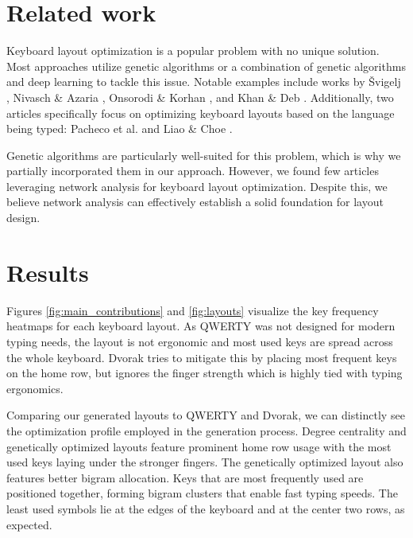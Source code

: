 \documentclass[9pt,twocolumn,twoside]{pnas-report}
\begin{document}
\section*{Related work}

Keyboard layout optimization is a popular problem with no unique solution.
Most approaches utilize genetic algorithms or a combination of genetic algorithms and deep learning to tackle this issue.
Notable examples include works by Švigelj \cite{svigelj2019}, Nivasch \& Azaria \cite{NiAz2021, NiAz2023}, Onsorodi \& Korhan \cite{onsorodi2020}, and Khan \& Deb \cite{KhDe2023}.
Additionally, two articles specifically focus on optimizing keyboard layouts based on the language being typed: Pacheco et al. \cite{eniac} and Liao \& Choe \cite{ChCh2013}.

Genetic algorithms are particularly well-suited for this problem, which is why we partially incorporated them in our approach.
However, we found few articles leveraging network analysis for keyboard layout optimization.
Despite this, we believe network analysis can effectively establish a solid foundation for layout design.

\section*{Results}

Figures \ref{fig:main_contributions} and \ref{fig:layouts} visualize the key frequency heatmaps for each keyboard layout.
As QWERTY was not designed for modern typing needs, the layout is not ergonomic and most used keys are spread across the whole keyboard.
Dvorak tries to mitigate this by placing most frequent keys on the home row, but ignores the finger strength which is highly tied with typing ergonomics.

Comparing our generated layouts to QWERTY and Dvorak, we can distinctly see the optimization profile employed in the generation process.
Degree centrality and genetically optimized layouts feature prominent home row usage with the most used keys laying under the stronger fingers.
The genetically optimized layout also features better bigram allocation.
Keys that are most frequently used are positioned together, forming bigram clusters that enable fast typing speeds.
The least used symbols lie at the edges of the keyboard and at the center two rows, as expected.
\end{document}
